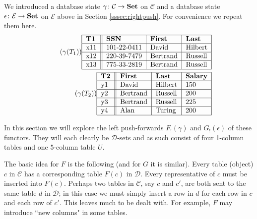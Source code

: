 \documentclass{amsart}
\def\mc{\mathcal}
\def\to{\rightarrow}
\def\taking{\colon}
\def\Set{{\bf Set}}
\def\mcC{\mc{C}}
\def\mcD{\mc{D}}
\def\mcE{\mc{E}}
\theoremstyle{remark}
\theoremstyle{definition}
\begin{document}
We introduced a database state $\gamma\taking\mcC\to\Set$ on $\mcC$ and a database state $\epsilon\taking\mcE\to\Set$ on $\mcE$ above in Section \ref{sssec:rightpush}.  For convenience we repeat them here.  \vspace{1in}\begin{align}\tag{$\gamma(T_1)$}\begin{tabular}{| l || l | l | l |}\hline {\bf T1}&{\bf SSN}&{\bf First}&{\bf Last}\\\hline x11&101-22-0411&David&Hilbert\\\hline x12&220-39-7479&Bertrand&Russell\\\hline x13&775-33-2819&Bertrand&Russell\\\hline\end{tabular}\\\tag{$\gamma(T_2)$}\begin{tabular}{| l || l | l | l |}\hline {\bf T2}&{\bf First}&{\bf Last}&{\bf Salary}\\\hline y1&David&Hilbert&150\\\hline y2&Bertrand&Russell&200\\\hline y3&Bertrand&Russell&225\\\hline y4&Alan&Turing&200\\\hline\end{tabular}\end{align}

In this section we will explore the left push-forwards $F_!(\gamma)$ and $G_!(\epsilon)$ of these functors.  They will each clearly be $\mcD$-sets and as such consist of four 1-column tables and one 5-column table $U$.

The basic idea for $F$ is the following (and for $G$ it is similar).  Every table (object) $c$ in $\mcC$ has a corresponding table $F(c)$ in $\mcD$.  Every representative of $c$ must be inserted into $F(c)$.  Perhaps two tables in $\mcC$, say $c$ and $c'$, are both sent to the same table $d$ in $\mcD$; in this case we must simply insert a row in $d$ for each row in $c$ and each row of $c'$.  This leaves much to be dealt with.   For example, $F$ may introduce ``new columns" in some tables.
\end{document}
